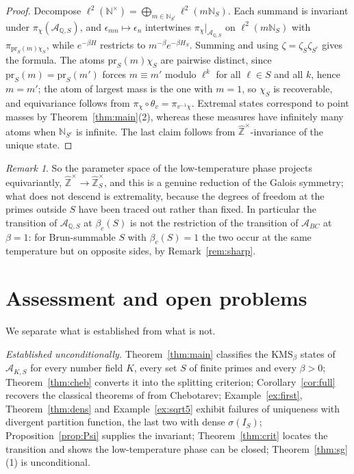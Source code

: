 \documentclass[11pt]{amsart}
\numberwithin{equation}{section}
\theoremstyle{definition}
\theoremstyle{remark}
\newtheorem{remark}[theorem]{Remark}
\newcommand{\Z}{\mathbb{Z}}
\newcommand{\Q}{\mathbb{Q}}
\newcommand{\N}{\mathbb{N}}
\newcommand{\hZ}{\widehat{\Z}}
\newcommand{\cA}{\mathcal{A}}
\begin{document}
\begin{proof}
Decompose $\ell^2(\N^\times)=\bigoplus_{m\in\N_{S^c}}\ell^2(m\N_S)$. Each
summand is invariant under $\pi_\chi(\cA_{\Q,S})$, and $\epsilon_{mn}\mapsto\epsilon_n$
intertwines $\pi_\chi|_{\cA_{\Q,S}}$ on $\ell^2(m\N_S)$ with
$\pi_{\mathrm{pr}_S(m)\chi_S}$, while $e^{-\beta H}$ restricts to
$m^{-\beta}e^{-\beta H_S}$. Summing and using $\zeta=\zeta_S\zeta_{S^c}$ gives
the formula. The atoms $\mathrm{pr}_S(m)\chi_S$ are pairwise distinct, since
$\mathrm{pr}_S(m)=\mathrm{pr}_S(m')$ forces $m\equiv m'$ modulo $\ell^k$ for all
$\ell\in S$ and all $k$, hence $m=m'$; the atom of largest mass is the one with
$m=1$, so $\chi_S$ is recoverable, and equivariance follows from
$\pi_\chi\circ\theta_v=\pi_{v^{-1}\chi}$. Extremal states correspond to point
masses by Theorem~\ref{thm:main}(2), whereas these measures have infinitely
many atoms when $\N_{S^c}$ is infinite. The last claim follows from
$\hZ^\times$-invariance of the unique state.
\end{proof}

\begin{remark}
So the parameter space of the low-temperature phase projects equivariantly,
$\hZ^\times\to\hZ_S^\times$, and this is a genuine reduction of the Galois
symmetry; what does not descend is extremality, because the degrees of freedom
at the primes outside $S$ have been traced out rather than fixed. In
particular the transition of $\cA_{\Q,S}$ at $\beta_c(S)$ is not the
restriction of the transition of $\cA_{BC}$ at $\beta=1$: for Brun-summable $S$
with $\beta_c(S)=1$ the two occur at the same temperature but on opposite
sides, by Remark~\ref{rem:sharp}.
\end{remark}

\section{Assessment and open problems}\label{sec:assessment}

We separate what is established from what is not.

\emph{Established unconditionally.} Theorem~\ref{thm:main} classifies the
$\mathrm{KMS}_\beta$ states of $\cA_{K,S}$ for every number field $K$, every
set $S$ of finite primes and every $\beta>0$; Theorem~\ref{thm:cheb} converts
it into the splitting criterion; Corollary~\ref{cor:full} recovers the
classical theorems of \cite{BC,LLN} from Chebotarev; Example~\ref{ex:first},
Theorem~\ref{thm:dens} and Example~\ref{ex:sqrt5} exhibit failures of
uniqueness with divergent partition function, the last two with dense
$\sigma(I_S)$; Proposition~\ref{prop:Psi} supplies the invariant;
Theorem~\ref{thm:crit} locates the transition and shows the low-temperature
phase can be closed; Theorem~\ref{thm:sg}(1) is unconditional.
\end{document}
